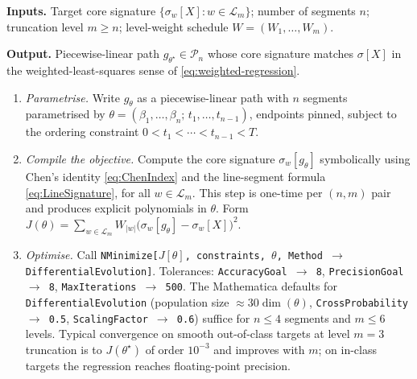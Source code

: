 \documentclass[12pt,english]{article}
\theoremstyle{remark}
\begin{document}
\begin{algorithm}[H]
\caption{Core-signature inversion via signature-space regression\label{alg:inversion-regression}}
\smallskip{}

\textbf{Inputs.} Target core signature $\{\sigma_{w}[X]:w\in\mathcal{L}_{m}\}$;
number of segments $n$; truncation level $m\geq n$; level-weight schedule
$W=(W_{1},\ldots,W_{m})$.

\textbf{Output.} Piecewise-linear path $g_{\theta^{\star}}\in\mathcal{P}_{n}$
whose core signature matches $\sigma[X]$ in the weighted-least-squares
sense of \eqref{eq:weighted-regression}.

\smallskip{}
\begin{enumerate}
\item \emph{Parametrise.} Write $g_{\theta}$ as a piecewise-linear path
with $n$ segments parametrised by $\theta=(\beta_{1},\ldots,\beta_{n};\,t_{1},\ldots,t_{n-1})$,
endpoints pinned, subject to the ordering constraint $0<t_{1}<\cdots<t_{n-1}<T$.

\item \emph{Compile the objective.} Compute the core signature $\sigma_{w}[g_{\theta}]$
symbolically using Chen's identity \eqref{eq:ChenIndex} and the line-segment
formula \eqref{eq:LineSignature}, for all $w\in\mathcal{L}_{m}$. This
step is one-time per $(n,m)$ pair and produces explicit polynomials
in $\theta$. Form $J(\theta)=\sum_{w\in\mathcal{L}_{m}}W_{|w|}\bigl(\sigma_{w}[g_{\theta}]-\sigma_{w}[X]\bigr)^{2}$.

\item \emph{Optimise.} Call \texttt{NMinimize[$J[\theta]$, constraints,
$\theta$, Method $\to$ DifferentialEvolution]}. Tolerances: \texttt{AccuracyGoal
$\to$ 8}, \texttt{PrecisionGoal $\to$ 8}, \texttt{MaxIterations $\to$
500}. The Mathematica defaults for \texttt{DifferentialEvolution}
(population size $\approx30\dim(\theta)$, \texttt{CrossProbability
$\to$ 0.5}, \texttt{ScalingFactor $\to$ 0.6}) suffice for $n\leq4$
segments and $m\leq6$ levels. Typical convergence on smooth out-of-class
targets at level $m=3$ truncation is to $J(\theta^{\star})$ of order
$10^{-3}$ and improves with $m$; on in-class targets the regression
reaches floating-point precision.


\end{enumerate}
\end{algorithm}
\end{document}

